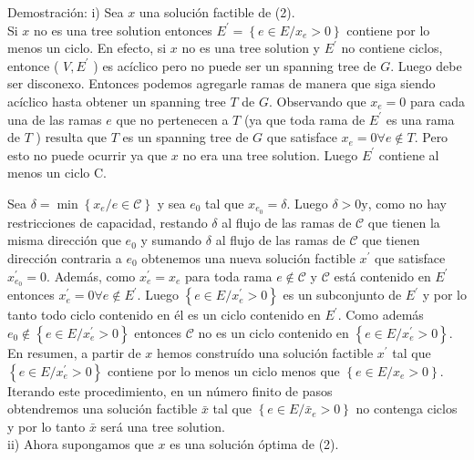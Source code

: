 \documentclass[10pt]{article}
\begin{document}
Demostración: i) Sea $x$ una solución factible de (2).\\
Si $x$ no es una tree solution entonces $E^{\prime}=\left\{e \in E / x_{e}>0\right\}$ contiene por lo menos un ciclo. En efecto, si $x$ no es una tree solution y $E^{\prime}$ no contiene ciclos, entonce ( $V, E^{\prime}$ ) es acíclico pero no puede ser un spanning tree de $G$. Luego debe ser disconexo. Entonces podemos agregarle ramas de manera que siga siendo acíclico hasta obtener un spanning tree $T$ de $G$. Observando que $x_{e}=0$ para cada una de las ramas $e$ que no pertenecen a $T$ (ya que toda rama de $E^{\prime}$ es una rama de $T$ ) resulta que $T$ es un spanning tree de $G$ que satisface $x_{e}=0 \forall e \notin T$. Pero esto no puede ocurrir ya que $x$ no era una tree solution. Luego $E^{\prime}$ contiene al menos un ciclo C.

Sea $\delta=\min \left\{x_{e} / e \in \mathcal{C}\right\}$ y sea $e_{0}$ tal que $x_{e_{0}}=\delta$. Luego $\delta>0 \mathrm{y}$, como no hay restricciones de capacidad, restando $\delta$ al flujo de las ramas de $\mathcal{C}$ que tienen la misma dirección que $e_{0}$ y sumando $\delta$ al flujo de las ramas de $\mathcal{C}$ que tienen dirección contraria a $e_{0}$ obtenemos una nueva solución factible $x^{\prime}$ que satisface $x_{e_{0}}^{\prime}=0$. Además, como $x_{e}^{\prime}=x_{e}$ para toda rama $e \notin \mathcal{C}$ y $\mathcal{C}$ está contenido en $E^{\prime}$ entonces $x_{e}^{\prime}=0 \forall e \notin E^{\prime}$. Luego $\left\{e \in E / x_{e}^{\prime}>0\right\}$ es un subconjunto de $E^{\prime}$ y por lo tanto todo ciclo contenido en él es un ciclo contenido en $E^{\prime}$. Como además $e_{0} \notin\left\{e \in E / x_{e}^{\prime}>0\right\}$ entonces $\mathcal{C}$ no es un ciclo contenido en $\left\{e \in E / x_{e}^{\prime}>0\right\}$.\\
En resumen, a partir de $x$ hemos construído una solución factible $x^{\prime}$ tal que $\left\{e \in E / x_{e}^{\prime}>0\right\}$ contiene por lo menos un ciclo menos que $\left\{e \in E / x_{e}>0\right\}$. Iterando este procedimiento, en un número finito de pasos\\
obtendremos una solución factible $\bar{x}$ tal que $\left\{e \in E / \bar{x}_{e}>0\right\}$ no contenga ciclos y por lo tanto $\bar{x}$ será una tree solution.\\
ii) Ahora supongamos que $x$ es una solución óptima de (2).
\end{document}
